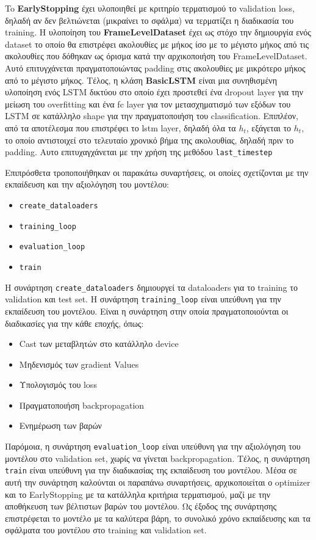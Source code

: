 \documentclass[a4paper,12pt]{article}
\begin{document}
To \textbf{EarlyStopping} έχει υλοποιηθεί με κριτηρίο τερματισμού το validation
loss, δηλαδή αν δεν βελτιώνεται (μικραίνει το σφάλμα) να τερματίζει η
διαδικασία του training. H υλοποίηση του \textbf{FrameLevelDataset} έχει ως
στόχο την δημιουργία ενός dataset το οποίο θα επιστρέφει ακολουθίες με μήκος
ίσο με το μέγιστο μήκος από τις ακολουθίες που δόθηκαν ως όρισμα κατά την
αρχικοποιήση του FrameLevelDataset. Αυτό επιτυγχάνεται πραγματοποιώντας padding
στις ακολουθίες με μικρότερο μήκος από το μέγιστο μήκος. Τέλος, η κλάση
\textbf{BasicLSTM} είναι μια συνηθισμένη υλοποίηση ενός LSTM δικτύου στο οποίο
έχει προστεθεί ένα dropout layer για την μείωση του overfitting και ένα fc
layer για τον μετασχηματισμό των εξόδων του LSTM σε κατάλληλο shape για την
πραγματοποιήση του classification. Επιπλέον, από τα αποτέλεσμα που επιστρέφει
το lstm layer, δηλαδή όλα τα $h_t$, εξάγεται το $h_t$, το οποίο αντιστοιχεί στο
τελευταίο χρονικό βήμα της ακολουθίας, δηλαδή πριν το padding. Αυτο
επιτυχαγχάνεται με την χρήση της μεθόδου \texttt{last\_timestep}

Επιπρόσθετα τροποποιήθηκαν οι παρακάτω συναρτήσεις, οι οποίες σχετίζονται
με την εκπαίδευση και την αξιολόγηση του μοντέλου:

\begin{itemize}
    \item \texttt{create\_dataloaders}
    \item \texttt{training\_loop}
    \item \texttt{evaluation\_loop}
    \item \texttt{train}
\end{itemize}

Η συνάρτηση \texttt{create\_dataloaders} δημιουργεί τα dataloaders για το training το validation και test set.
Η συνάρτηση \texttt{training\_loop} είναι υπεύθυνη για την εκπαίδευση του μοντέλου. Είναι η συνάρτηση στην οποία
πραγματοποιούνται οι διαδικασίες για την κάθε εποχής, όπως:

\begin{itemize}
    \item Cast των μεταβλητών στο κατάλληλο device
    \item Μηδενισμός των gradient Values
    \item Υπολογισμός του loss
    \item Πραγματοποιήση backpropagation
    \item Ενημέρωση των βαρών
\end{itemize}

Παρόμοια, η συνάρτηση \texttt{evaluation\_loop} είναι υπεύθυνη
για την αξιολόγηση του μοντέλου στο validation set, χωρίς να γίνεται backpropagation.
Τέλος, η συνάρτηση \texttt{train} είναι υπεύθυνη για την διαδικασίας της εκπαίδευση του μοντέλου.
Μέσα σε αυτή την συνάρτηση καλούνται οι παραπάνω συναρτήσεις, αρχικοποιείται ο optimizer και το
EarlyStopping με τα κατάλληλα κριτήρια τερματισμού, μαζί με την αποθήκευση των βέλτιστων βαρών
του μοντέλου. Ως έξοδος της συνάρτησης επιστρέφεται το μοντέλο με τα καλύτερα βάρη, το συνολικό χρόνο
εκπαίδευσης και τα σφάλματα του μοντέλου στο training και validation set.
\end{document}
